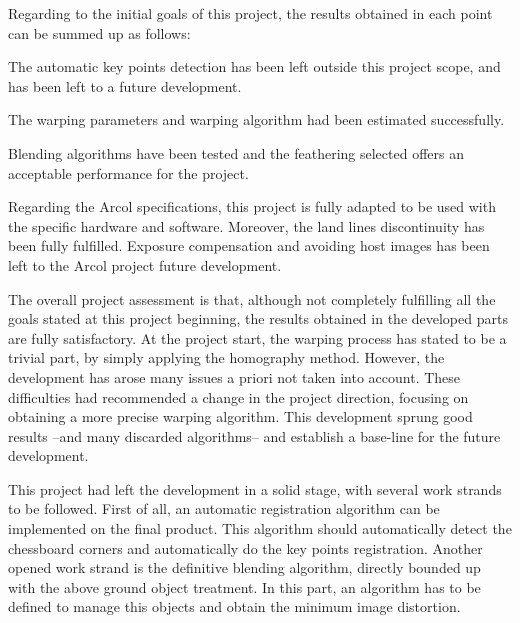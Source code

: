 Regarding to the initial goals of this project, the results obtained in each point can be summed up as follows:
\vspace{-1em}
\begin{description}[font=\normalfont\textsl]\itemsep2pt \parskip1pt 
\item [Representative points automatic detection.] The automatic key points detection has been left outside this project scope, and has been left to a future development. 
\item [Estimate the warping parameters. ]The warping parameters and warping algorithm had been estimated successfully.
\item [Blending the results on the final stitching. ]Blending algorithms have been tested and the feathering selected offers an acceptable performance for the project.
\item [Follow the requirements stated by the Arcol project. ]Regarding the Arcol specifications, this project is fully adapted to be used with the specific hardware and software. Moreover, the land lines discontinuity has been fully fulfilled. Exposure compensation and avoiding host images has been left to the Arcol project future development.
\vspace{-1em}
\end{description}

The overall project assessment is that, although not completely fulfilling all the goals stated at this project beginning, the results obtained in the developed parts are fully satisfactory. At the project start, the warping process has stated to be a trivial part, by simply applying the homography method. However, the development has arose many issues a priori not taken into account. These difficulties had recommended a change in the project direction, focusing on obtaining a more precise warping algorithm. This development sprung good results --and many discarded algorithms-- and establish a base-line for the future development.

This project had left the development in a solid stage, with several work strands to be followed. First of all, an automatic registration algorithm can be implemented on the final product. This algorithm should automatically detect the chessboard corners and automatically do the key points registration. Another opened work strand is the definitive blending algorithm, directly bounded up with the above ground object treatment.  In this part, an algorithm has to be defined to manage this objects and obtain the minimum image distortion.







